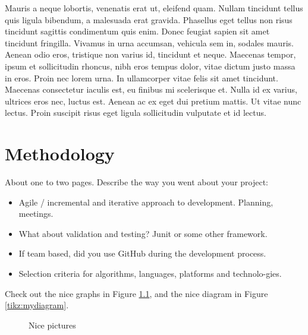 Mauris a neque lobortis, venenatis erat ut, eleifend quam. Nullam tincidunt tellus quis ligula bibendum, a malesuada erat gravida. Phasellus eget tellus non risus tincidunt sagittis condimentum quis enim. Donec feugiat sapien sit amet tincidunt fringilla. Vivamus in urna accumsan, vehicula sem in, sodales mauris. Aenean odio eros, tristique non varius id, tincidunt et neque. Maecenas tempor, ipsum et sollicitudin rhoncus, nibh eros tempus dolor, vitae dictum justo massa in eros. Proin nec lorem urna. In ullamcorper vitae felis sit amet tincidunt. Maecenas consectetur iaculis est, eu finibus mi scelerisque et. Nulla id ex varius, ultrices eros nec, luctus est. Aenean ac ex eget dui pretium mattis. Ut vitae nunc lectus. Proin suscipit risus eget ligula sollicitudin vulputate et id lectus.


\chapter{Methodology}
About one to two pages.
Describe the way you went about your project:
\begin{itemize}
\item Agile / incremental and iterative approach to development. Planning, meetings.
\item What about validation and testing? Junit or some other framework.
\item If team based, did you use GitHub during the development process.
\item Selection criteria for algorithms, languages, platforms and technolo-gies.
\end{itemize}
Check out the nice graphs in Figure \ref{tikz:graphs}, and the nice diagram in Figure \ref{tikz:mydiagram}.

\begin{figure}
  \centering
  \hspace{1.5cm}
  \caption{Nice pictures}
  \label{tikz:graphs}
\end{figure}



